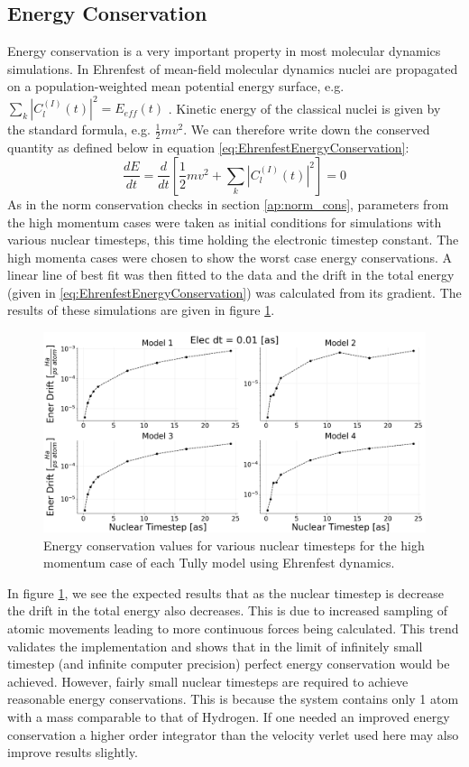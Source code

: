 \subsection{Energy Conservation}
Energy conservation is a very important property in most molecular dynamics simulations. In Ehrenfest of mean-field molecular dynamics nuclei are propagated on a population-weighted mean potential energy surface, e.g. $\sum_{k}|C_{l}^{(I)}(t)|^2 = E_{eff}(t)$ \cite{EhrenEnerCons}. Kinetic energy of the classical nuclei is given by the standard formula, e.g. $\frac{1}{2} m v^2$. We can therefore write down the conserved quantity as defined below in equation \eqref{eq:EhrenfestEnergyConservation}:
\begin{equation}
  \frac{d E}{dt} = \frac{d}{dt} \left[ \frac{1}{2} m v^2 + \sum_{k}|C_{l}^{(I)}(t)|^2 \right] = 0
  \label{eq:EhrenfestEnergyConservation}
\end{equation}
As in the norm conservation checks in section \ref{ap:norm_cons},  parameters from the high momentum cases were taken as initial conditions for simulations with various nuclear timesteps, this time holding the electronic timestep constant. The high momenta cases were chosen to show the worst case energy conservations. A linear line of best fit was then fitted to the data and the drift in the total energy (given in \eqref{eq:EhrenfestEnergyConservation}) was calculated from its gradient. The results of these simulations are given in figure \ref{fig:EhrenEnerCons}.
\begin{figure}[ht]
  \includegraphics[width=\textwidth]{../img/CTMQC/TullyModels/Ehren_EnerCons.png}
  \caption{\label{fig:EhrenEnerCons}Energy conservation values for various nuclear timesteps for the high momentum case of each Tully model using Ehrenfest dynamics.}
\end{figure}
In figure \ref{fig:EhrenEnerCons}, we see the expected results that as the nuclear timestep is decrease the drift in the total energy also decreases. This is due to increased sampling of atomic movements leading to more continuous forces being calculated. This trend validates the implementation and shows that in the limit of infinitely small timestep (and infinite computer precision) perfect energy conservation would be achieved. However, fairly small nuclear timesteps are required to achieve reasonable energy conservations. This is because the system contains only 1 atom with a mass comparable to that of Hydrogen. If one needed an improved energy conservation a higher order integrator than the velocity verlet used here may also improve results slightly.

